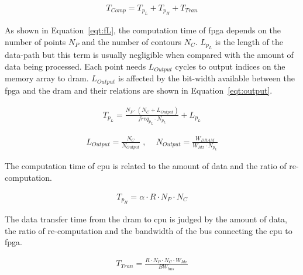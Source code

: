 \begin{equation}
\begin{aligned}
T_{Comp} = T_{p_L} + T_{p_H} + T_{Tran}
\end{aligned}
\label{eqt:fM}
\end{equation}

As shown in Equation~\ref{eqt:fL}, the computation time of \gls{fpga} depends on the number of points $N_P$ and the number of contours $N_C$.
$L_{p_L}$ is the length of the data-path but this term is usually negligible when compared with the amount of data being processed.
Each point needs $L_{Output}$ cycles to output indices on the memory array to \gls{dram}.
$L_{Output}$ is affected by the bit-width available between the \gls{fpga} and the \gls{dram} and their relations are shown in Equation~\ref{eqt:output}.

\begin{equation}
\begin{aligned}
T_{p_L} = \frac{N_P \cdot (N_C+L_{Output})}{freq_{p_L} \cdot N_{p_L}} + L_{p_L}
\end{aligned}
\label{eqt:fL}
\end{equation}

\begin{equation}
\begin{aligned}
L_{Output} = \frac{N_C}{N_{Output}} \mbox{ , } \quad
N_{Output} = \frac{W_{DRAM}}{W_{Idx} \cdot N_{p_L}}
\end{aligned}
\label{eqt:output}
\end{equation}

The computation time of \gls{cpu} is related to the amount of data and the ratio of re-computation.

\begin{equation}
\begin{aligned}
T_{p_H} = \alpha \cdot R \cdot N_P \cdot N_C
\end{aligned}
\label{eqt:fH}
\end{equation}

The data transfer time from the \gls{dram} to \gls{cpu} is judged by the amount of data, the ratio of re-computation and the bandwidth of the bus connecting the \gls{cpu} to \gls{fpga}.

\begin{equation}
\begin{aligned}
T_{Tran} = \frac{R \cdot N_P \cdot N_C \cdot W_{Idx}}{BW_{bus}}
\end{aligned}
\label{eqt:tran}
\end{equation}

